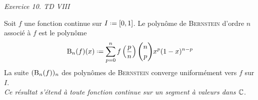 \emph{Exercice 10. TD VIII} \\
\begin{theo}
    Soit $f$ une fonction continue sur $I \defeq [0, 1]$. Le polynôme de \textsc{Bernstein} d'ordre $n$ associé à $f$ est le polynôme
    \begin{equation} \label{1}
        \Bernstein_n(f)(x) \defeq \sum_{p=0}^{n} f \left( \frac{p}{n} \right) \binom{n}{p} x^p (1-x)^{n-p}
    \end{equation}
    La suite $(\mathrm{B}_n(f))_n$ des polynômes de \textsc{Bernstein} converge uniformément vers $f$ sur $I$. \\
    \textit{Ce résultat s'étend à toute fonction continue sur un segment à valeurs dans $\mathbb{C}$}.
\end{theo}


